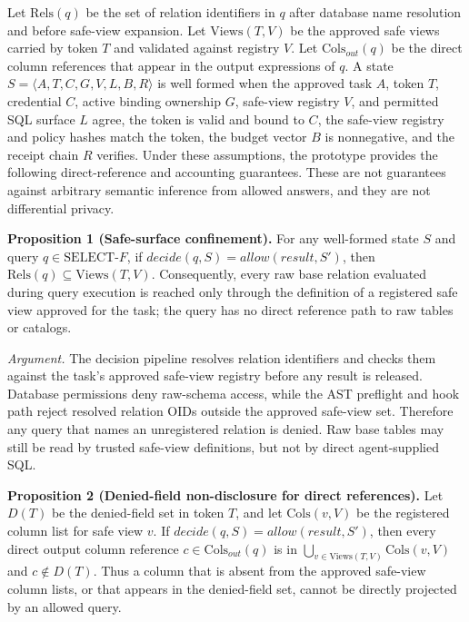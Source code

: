 \documentclass[journal]{IEEEtran}
\begin{document}
Let \(\mathrm{Rels}(q)\) be the set of relation identifiers in \(q\)
after database name resolution and before safe-view expansion. Let
\(\mathrm{Views}(T,V)\) be the approved safe views carried by token \(T\)
and validated against registry \(V\). Let \(\mathrm{Cols}_{out}(q)\) be
the direct column references that appear in the output expressions of
\(q\). A state \(S=\langle A,T,C,G,V,L,B,R\rangle\) is well formed when
the approved task \(A\), token \(T\), credential \(C\), active binding
ownership \(G\), safe-view registry \(V\), and permitted SQL surface
\(L\) agree, the token is valid and bound to \(C\), the safe-view registry
and policy hashes match the token, the budget vector \(B\) is
nonnegative, and the receipt chain \(R\) verifies. Under these
assumptions, the
prototype provides the following direct-reference and accounting
guarantees. These are not guarantees against arbitrary semantic
inference from allowed answers, and they are not differential privacy.

\noindent\textbf{Proposition 1 (Safe-surface confinement).}
For any well-formed state \(S\) and query
\(q \in \mathrm{SELECT}\text{-}F\), if
\(decide(q,S)=allow(result,S')\), then
\(\mathrm{Rels}(q)\subseteq \mathrm{Views}(T,V)\). Consequently, every
raw base relation evaluated during query execution is reached only
through the definition of a registered safe view approved for the task;
the query has no direct reference path to raw tables or catalogs.

\emph{Argument.} The decision pipeline resolves relation identifiers and
checks them against the task's approved safe-view registry before any
result is released. Database permissions deny raw-schema access, while
the AST preflight and hook path reject resolved relation OIDs outside
the approved safe-view set. Therefore any query that names an
unregistered relation is denied. Raw base tables may still be read by
trusted safe-view definitions, but not by direct agent-supplied SQL.

\noindent\textbf{Proposition 2 (Denied-field non-disclosure for direct
references).}
Let \(D(T)\) be the denied-field set in token \(T\), and let
\(\mathrm{Cols}(v,V)\) be the registered column list for safe view
\(v\). If \(decide(q,S)=allow(result,S')\), then every direct output
column reference \(c \in \mathrm{Cols}_{out}(q)\) is in
\(\bigcup_{v\in \mathrm{Views}(T,V)} \mathrm{Cols}(v,V)\) and
\(c\notin D(T)\). Thus a column that is absent from the approved
safe-view column lists, or that appears in the denied-field set, cannot
be directly projected by an allowed query.
\end{document}
